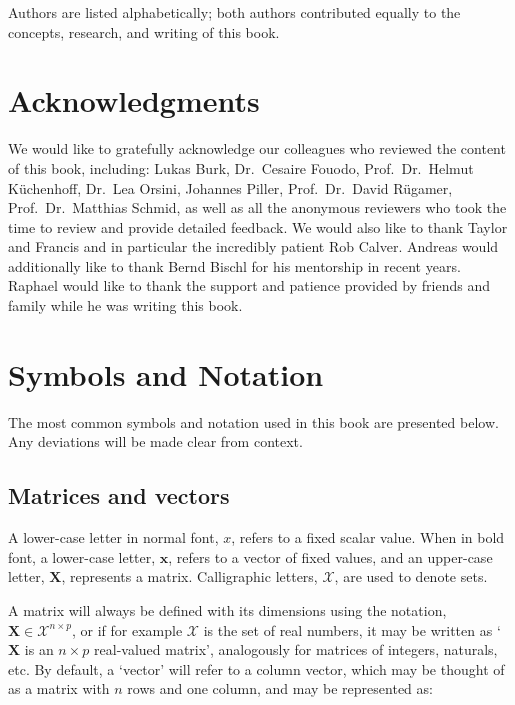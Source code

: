 \documentclass[
  letterpaper,
  krantz2]{style/krantz}
\begin{document}
Authors are listed alphabetically; both authors contributed equally to
the concepts, research, and writing of this book.

\chapter*{Acknowledgments}

We would like to gratefully acknowledge our colleagues who reviewed the
content of this book, including: Lukas Burk, Dr.~Cesaire Fouodo,
Prof.~Dr.~Helmut Küchenhoff, Dr.~Lea Orsini, Johannes Piller,
Prof.~Dr.~David Rügamer, Prof.~Dr.~Matthias Schmid, as well as all the
anonymous reviewers who took the time to review and provide detailed
feedback. We would also like to thank Taylor and Francis and in
particular the incredibly patient Rob Calver. Andreas would additionally
like to thank Bernd Bischl for his mentorship in recent years. Raphael
would like to thank the support and patience provided by friends and family while he was writing this book.

\chapter*{Symbols and Notation}\label{symbols-and-notation}


The most common symbols and notation used in this book are presented
below. Any deviations will be made clear from context.

\section*{Matrices and vectors}\label{matrices-and-vectors}


A lower-case letter in normal font, \(x\), refers to a fixed scalar
value. When in bold font, a lower-case letter, \(\mathbf{x}\), refers to
a vector of fixed values, and an upper-case letter, \(\mathbf{X}\),
represents a matrix. Calligraphic letters, \(\mathcal{X}\), are used to
denote sets.

A matrix will always be defined with its dimensions using the notation,
\(\mathbf{X}\in \mathcal{X}^{n \times p}\), or if for example
\(\mathcal{X}\) is the set of real numbers, it may be written as
`\(\mathbf{X}\) is an \(n \times p\) real-valued matrix', analogously
for matrices of integers, naturals, etc. By default, a `vector' will
refer to a column vector, which may be thought of as a matrix with \(n\)
rows and one column, and may be represented as:
\end{document}
